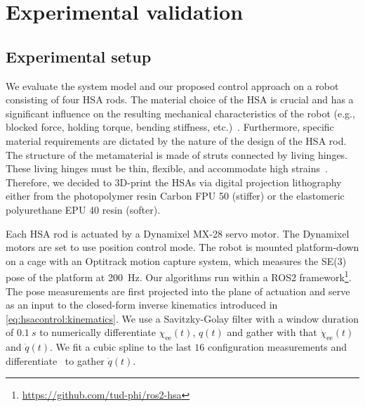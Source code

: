 \section{Experimental validation}

\subsection{Experimental setup}
We evaluate the system model and our proposed control approach on a robot consisting of four HSA rods.
The material choice of the \gls{HSA} is crucial and has a significant influence on the resulting mechanical characteristics of the robot  (e.g., blocked force, holding torque, bending stiffness, etc.)~\cite{truby2021recipe}. Furthermore, specific material requirements are dictated by the nature of the design of the \gls{HSA} rod. The structure of the metamaterial is made of struts connected by living hinges. These living hinges must be thin, flexible, and accommodate high strains~\cite{truby2021recipe}.
Therefore, we decided to 3D-print the \glspl{HSA} via digital projection lithography either from the photopolymer resin Carbon FPU 50 (stiffer) or the elastomeric polyurethane EPU 40 resin (softer).

Each \gls{HSA} rod is actuated by a Dynamixel MX-28 servo motor. The Dynamixel motors are set to use position control mode. %
The robot is mounted platform-down on a cage with an Optitrack motion capture system, which measures the SE(3) pose of the platform at \SI{200}{Hz}.
Our algorithms run within a ROS2 framework\footnote{\url{https://github.com/tud-phi/ros2-hsa}}. %
The pose measurements are first projected into the plane of actuation and serve as an input to the closed-form inverse kinematics introduced in \eqref{eq:hsacontrol:kinematics}. 
We use a Savitzky-Golay filter with a window duration of $\SI{0.1}{s}$ to numerically differentiate $\chi_\mathrm{ee}(t)$, $q(t)$ and gather with that $\dot{\chi}_\mathrm{ee}(t)$ and $\dot{q}(t)$.
We fit a cubic spline to the last $16$ configuration measurements and differentiate~\cite{kaptanoglu2022pysindy} to gather $\dot{q}(t)$.


